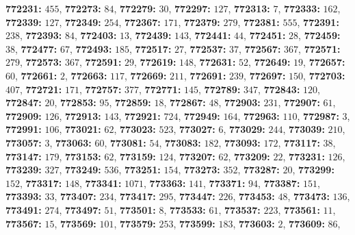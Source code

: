 \textsf{\bfseries 772231:} $455$, \textsf{\bfseries 772273:} $84$, \textsf{\bfseries 772279:} $30$, \textsf{\bfseries 772297:} $127$, \textsf{\bfseries 772313:} $7$, \textsf{\bfseries 772333:} $162$, \textsf{\bfseries 772339:} $127$, \textsf{\bfseries 772349:} $254$, \textsf{\bfseries 772367:} $171$, \textsf{\bfseries 772379:} $279$, \textsf{\bfseries 772381:} $555$, \textsf{\bfseries 772391:} $238$, \textsf{\bfseries 772393:} $84$, \textsf{\bfseries 772403:} $13$, \textsf{\bfseries 772439:} $143$, \textsf{\bfseries 772441:} $44$, \textsf{\bfseries 772451:} $28$, \textsf{\bfseries 772459:} $38$, \textsf{\bfseries 772477:} $67$, \textsf{\bfseries 772493:} $185$, \textsf{\bfseries 772517:} $27$, \textsf{\bfseries 772537:} $37$, \textsf{\bfseries 772567:} $367$, \textsf{\bfseries 772571:} $279$, \textsf{\bfseries 772573:} $367$, \textsf{\bfseries 772591:} $29$, \textsf{\bfseries 772619:} $148$, \textsf{\bfseries 772631:} $52$, \textsf{\bfseries 772649:} $19$, \textsf{\bfseries 772657:} $60$, \textsf{\bfseries 772661:} $2$, \textsf{\bfseries 772663:} $117$, \textsf{\bfseries 772669:} $211$, \textsf{\bfseries 772691:} $239$, \textsf{\bfseries 772697:} $150$, \textsf{\bfseries 772703:} $407$, \textsf{\bfseries 772721:} $171$, \textsf{\bfseries 772757:} $377$, \textsf{\bfseries 772771:} $145$, \textsf{\bfseries 772789:} $347$, \textsf{\bfseries 772843:} $120$, \textsf{\bfseries 772847:} $20$, \textsf{\bfseries 772853:} $95$, \textsf{\bfseries 772859:} $18$, \textsf{\bfseries 772867:} $48$, \textsf{\bfseries 772903:} $231$, \textsf{\bfseries 772907:} $61$, \textsf{\bfseries 772909:} $126$, \textsf{\bfseries 772913:} $143$, \textsf{\bfseries 772921:} $724$, \textsf{\bfseries 772949:} $164$, \textsf{\bfseries 772963:} $110$, \textsf{\bfseries 772987:} $3$, \textsf{\bfseries 772991:} $106$, \textsf{\bfseries 773021:} $62$, \textsf{\bfseries 773023:} $523$, \textsf{\bfseries 773027:} $6$, \textsf{\bfseries 773029:} $244$, \textsf{\bfseries 773039:} $210$, \textsf{\bfseries 773057:} $3$, \textsf{\bfseries 773063:} $60$, \textsf{\bfseries 773081:} $54$, \textsf{\bfseries 773083:} $182$, \textsf{\bfseries 773093:} $172$, \textsf{\bfseries 773117:} $38$, \textsf{\bfseries 773147:} $179$, \textsf{\bfseries 773153:} $62$, \textsf{\bfseries 773159:} $124$, \textsf{\bfseries 773207:} $62$, \textsf{\bfseries 773209:} $22$, \textsf{\bfseries 773231:} $126$, \textsf{\bfseries 773239:} $327$, \textsf{\bfseries 773249:} $536$, \textsf{\bfseries 773251:} $154$, \textsf{\bfseries 773273:} $352$, \textsf{\bfseries 773287:} $20$, \textsf{\bfseries 773299:} $152$, \textsf{\bfseries 773317:} $148$, \textsf{\bfseries 773341:} $1071$, \textsf{\bfseries 773363:} $141$, \textsf{\bfseries 773371:} $94$, \textsf{\bfseries 773387:} $151$, \textsf{\bfseries 773393:} $33$, \textsf{\bfseries 773407:} $234$, \textsf{\bfseries 773417:} $295$, \textsf{\bfseries 773447:} $226$, \textsf{\bfseries 773453:} $48$, \textsf{\bfseries 773473:} $136$, \textsf{\bfseries 773491:} $274$, \textsf{\bfseries 773497:} $51$, \textsf{\bfseries 773501:} $8$, \textsf{\bfseries 773533:} $61$, \textsf{\bfseries 773537:} $223$, \textsf{\bfseries 773561:} $11$, \textsf{\bfseries 773567:} $15$, \textsf{\bfseries 773569:} $101$, \textsf{\bfseries 773579:} $253$, \textsf{\bfseries 773599:} $183$, \textsf{\bfseries 773603:} $2$, \textsf{\bfseries 773609:} $86$, 
